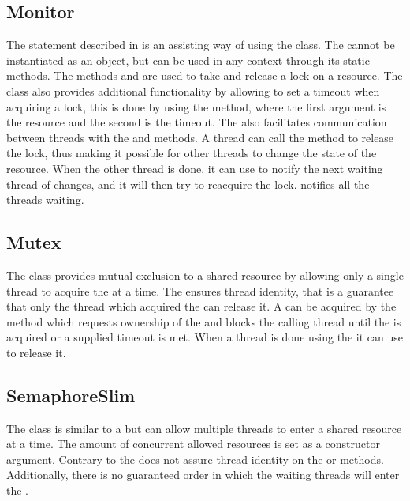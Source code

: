 \subsection{Monitor}
The  statement described in  is an assisting way of using the  class\cite{msdnMonitor}. The  cannot be instantiated as an object, but can be used in any context through its static methods. The methods  and  are used to take and release a lock on a resource. The  class also provides additional functionality by allowing to set a timeout when acquiring a lock, this is done by using the  method, where the first argument is the resource and the second is the timeout. The  also facilitates communication between threads with the   and  methods. A thread can call the  method to release the lock, thus making it possible for other threads to change the state of the resource. When the other thread is done, it can use  to notify the next waiting thread of changes, and it will then try to reacquire the lock.  notifies all the threads waiting.
\subsection{Mutex}
The  class\cite{msdnMutex} provides mutual exclusion to a shared resource by allowing only a single thread to acquire the  at a time. The  ensures thread identity, that is a guarantee that only the thread which acquired the  can release it. A  can be acquired by the method  which requests ownership of the  and blocks the calling thread until the  is acquired or a supplied timeout is met. When a thread is done using the  it can use  to release it.

\subsection{SemaphoreSlim}
The  class\cite{msdnSemaphoreSlim} is similar to a  but can allow multiple threads to enter a shared resource at a time. The amount of concurrent allowed resources is set as a constructor argument. Contrary to  the  does not assure thread identity on the  or  methods. Additionally, there is no guaranteed order in which the waiting threads will enter the . 


